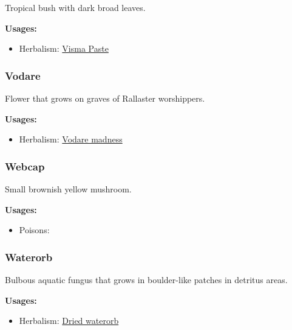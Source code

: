Tropical bush with dark broad leaves.

\vspace{5mm}

\textbf{Usages:}

\begin{itemize}[noitemsep]
\item[] Herbalism: \hyperref[Visma Paste]{Visma Paste}
\end{itemize}

\subsubsection{Vodare}
\label{Vodare}

Flower that grows on graves of Rallaster worshippers.

\vspace{5mm}

\textbf{Usages:}

\begin{itemize}[noitemsep]
\item[] Herbalism: \hyperref[Vodare madness]{Vodare madness}
\end{itemize}

\subsubsection{Webcap}
\label{Webcap}

Small brownish yellow mushroom.

\vspace{5mm}

\textbf{Usages:}

\begin{itemize}[noitemsep]
\item[] Poisons: \poison
\end{itemize}

\subsubsection{Waterorb}
\label{Waterorb}

Bulbous aquatic fungus that grows in boulder-like patches in detritus areas.

\vspace{5mm}

\textbf{Usages:}

\begin{itemize}[noitemsep]
\item[] Herbalism: \hyperref[Dried waterorb]{Dried waterorb}
\end{itemize}

